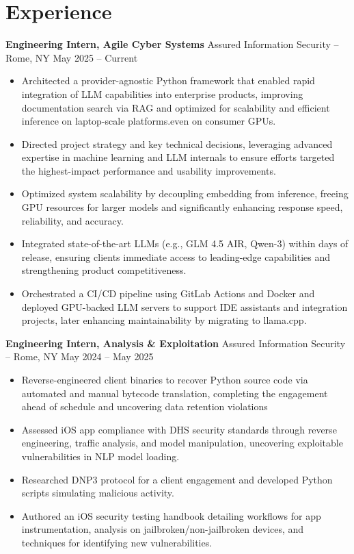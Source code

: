 \section*{Experience}
\textbf{Engineering Intern, Agile Cyber Systems} {Assured Information Security} -- Rome, NY \hfill May 2025 -- Current \\
\vspace{-8pt}
\begin{itemize}
	\item Architected a provider-agnostic Python framework that enabled rapid integration of LLM capabilities into enterprise products, improving documentation search via RAG and optimized for scalability and efficient inference on laptop-scale platforms.even on consumer GPUs.
	\item Directed project strategy and key technical decisions, leveraging advanced expertise in machine learning and LLM internals to ensure efforts targeted the highest-impact performance and usability improvements.
	\item Optimized system scalability by decoupling embedding from inference, freeing GPU resources for larger models and significantly enhancing response speed, reliability, and accuracy.
	\item Integrated state-of-the-art LLMs (e.g., GLM 4.5 AIR, Qwen-3) within days of release, ensuring clients immediate access to leading-edge capabilities and strengthening product competitiveness.
	\item Orchestrated a CI/CD pipeline using GitLab Actions and Docker and deployed GPU-backed LLM servers to support IDE assistants and integration projects, later enhancing maintainability by migrating to llama.cpp.
\end{itemize}
\vspace{-8pt}
\textbf{Engineering Intern, Analysis \& Exploitation} {Assured Information Security} -- Rome, NY \hfill May 2024 -- May 2025 \\
\vspace{-8pt}
\begin{itemize}
	\item Reverse-engineered client binaries to recover Python source code via automated and manual bytecode translation, completing the engagement ahead of schedule and uncovering data retention violations
	\item Assessed iOS app compliance with DHS security standards through reverse engineering, traffic analysis, and model manipulation, uncovering exploitable vulnerabilities in NLP model loading.
	\item Researched DNP3 protocol for a client engagement and developed Python scripts simulating malicious activity.
	\item Authored an iOS security testing handbook detailing workflows for app instrumentation, analysis on jailbroken/non-jailbroken devices, and techniques for identifying new vulnerabilities.
\end{itemize}

